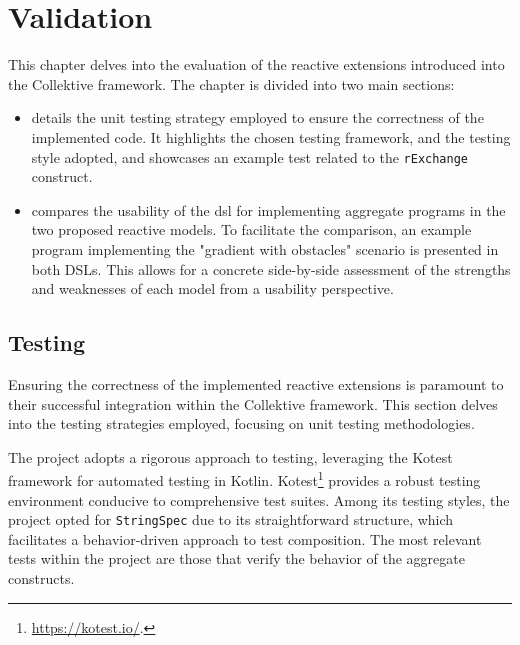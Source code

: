 
\chapter{Validation}
\label{chap:evaluation}

This chapter delves into the evaluation of the reactive extensions introduced into the Collektive framework. The chapter is divided into two main sections:

\begin{itemize}
    \item {} details the unit testing strategy employed to ensure the correctness of the implemented code. It highlights the chosen testing framework, and the testing style adopted, and showcases an example test related to the \texttt{rExchange} construct.
    \item {} compares the usability of the \ac{dsl} for implementing aggregate programs in the two proposed reactive models. To facilitate the comparison, an example program implementing the "gradient with obstacles" scenario is presented in both DSLs. This allows for a concrete side-by-side assessment of the strengths and weaknesses of each model from a usability perspective.
\end{itemize}

\section{Testing}
\label{section:testing}

Ensuring the correctness of the implemented reactive extensions is paramount to their successful integration within the Collektive framework. This section delves into the testing strategies employed, focusing on unit testing methodologies.

The project adopts a rigorous approach to testing, leveraging the Kotest framework for automated testing in Kotlin. Kotest\footnote{\url{https://kotest.io/}.} provides a robust testing environment conducive to comprehensive test suites. Among its testing styles, the project opted for \texttt{StringSpec} due to its straightforward structure, which facilitates a behavior-driven approach to test composition. The most relevant tests within the project are those that verify the behavior of the aggregate constructs.

